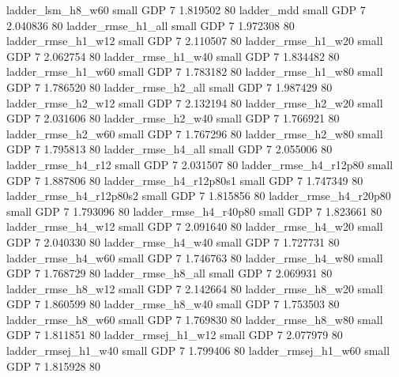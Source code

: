        ladder_lsm_h8_w60      small      GDP                 7 1.819502 80
              ladder_mdd      small      GDP                 7 2.040836 80
      ladder_rmse_h1_all      small      GDP                 7 1.972308 80
      ladder_rmse_h1_w12      small      GDP                 7 2.110507 80
      ladder_rmse_h1_w20      small      GDP                 7 2.062754 80
      ladder_rmse_h1_w40      small      GDP                 7 1.834482 80
      ladder_rmse_h1_w60      small      GDP                 7 1.783182 80
      ladder_rmse_h1_w80      small      GDP                 7 1.786520 80
      ladder_rmse_h2_all      small      GDP                 7 1.987429 80
      ladder_rmse_h2_w12      small      GDP                 7 2.132194 80
      ladder_rmse_h2_w20      small      GDP                 7 2.031606 80
      ladder_rmse_h2_w40      small      GDP                 7 1.766921 80
      ladder_rmse_h2_w60      small      GDP                 7 1.767296 80
      ladder_rmse_h2_w80      small      GDP                 7 1.795813 80
      ladder_rmse_h4_all      small      GDP                 7 2.055006 80
      ladder_rmse_h4_r12      small      GDP                 7 2.031507 80
   ladder_rmse_h4_r12p80      small      GDP                 7 1.887806 80
 ladder_rmse_h4_r12p80s1      small      GDP                 7 1.747349 80
 ladder_rmse_h4_r12p80s2      small      GDP                 7 1.815856 80
   ladder_rmse_h4_r20p80      small      GDP                 7 1.793096 80
   ladder_rmse_h4_r40p80      small      GDP                 7 1.823661 80
      ladder_rmse_h4_w12      small      GDP                 7 2.091640 80
      ladder_rmse_h4_w20      small      GDP                 7 2.040330 80
      ladder_rmse_h4_w40      small      GDP                 7 1.727731 80
      ladder_rmse_h4_w60      small      GDP                 7 1.746763 80
      ladder_rmse_h4_w80      small      GDP                 7 1.768729 80
      ladder_rmse_h8_all      small      GDP                 7 2.069931 80
      ladder_rmse_h8_w12      small      GDP                 7 2.142664 80
      ladder_rmse_h8_w20      small      GDP                 7 1.860599 80
      ladder_rmse_h8_w40      small      GDP                 7 1.753503 80
      ladder_rmse_h8_w60      small      GDP                 7 1.769830 80
      ladder_rmse_h8_w80      small      GDP                 7 1.811851 80
     ladder_rmsej_h1_w12      small      GDP                 7 2.077979 80
     ladder_rmsej_h1_w40      small      GDP                 7 1.799406 80
     ladder_rmsej_h1_w60      small      GDP                 7 1.815928 80
